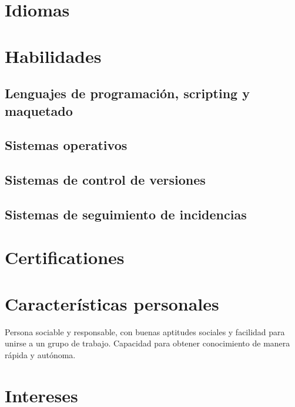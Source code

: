 \documentclass[12pt,a4paper]{moderncv}
\begin{document}
\section{Idiomas}
\section{Habilidades}
\subsection{Lenguajes de programación, scripting y maquetado}
\subsection{Sistemas operativos}
\subsection{Sistemas de control de versiones}
\subsection{Sistemas de seguimiento de incidencias}
\section{Certificationes}
\section{Características personales}
Persona sociable y responsable, con buenas aptitudes sociales y facilidad para unirse a un grupo de trabajo.
Capacidad para obtener conocimiento de manera rápida y autónoma.

\section{Intereses}
\renewcommand{\listitemsymbol}{} %
\end{document}
